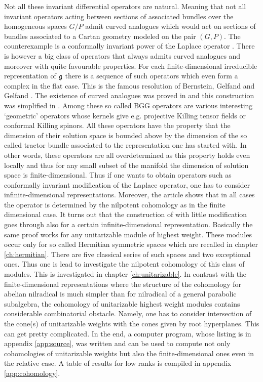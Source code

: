 Not all these invariant differential operators are natural. Meaning that not all invariant operators acting between sections of associated bundles over the homogeneous spaces $G/P$ admit curved analogues which would act on sections of bundles associated to a Cartan geometry modeled on the pair $(G, P)$. The counterexample is a conformally invariant power of the Laplace operator \cite{graham_conformally_1992, gover_conformally_2004}. There is however a big class of operators that always admits curved analogues and moreover with quite favourable properties. For each finite-dimensional irreducible representation of $\mathfrak{g}$ there is a sequence of such operators which even form a complex in the flat case. This is the famous resolution of Bernstein, Gelfand and Gelfand \cite{bernstein_differential_1975}. The existence of curved analogues was proved in \cite{cap_bernstein-gelfand-gelfand_2001} and this construction was simplified in \cite{calderbank_differential_2001}. Among these so called BGG operators are various interesting `geometric' operators whose kernels give e.g. projective Killing tensor fields or conformal Killing spinors. All these operators have the property that the dimension of their solution space is bounded above by the dimension of the so called tractor bundle associated to the representation one has started with. In other words, these operators are all overdetermined as this property holds even locally and thus for any small subset of the manifold the dimension of solution space is finite-dimensional. Thus if one wants to obtain operators such as conformally invariant modification of the Laplace operator, one has to consider infinite-dimensional representations. Moreover, the article \cite{shaynkman_unfolded_2006} shows that in all cases the operator is determined by the nilpotent cohomology as in the finite dimensional case. It turns out that the construction of \cite{calderbank_differential_2001} with little modification goes through also for a certain infinite-dimensional representation. Basically the same proof works for any unitarizable module of highest weight. These modules occur only for so called Hermitian symmetric spaces which are recalled in chapter \ref{ch:hermitian}. There are five classical series of such spaces and two exceptional ones. Thus one is lead to investigate the nilpotent cohomology of this class of modules. This is investigated in chapter \ref{ch:unitarizable}. In contrast with the finite-dimensional representations where the structure of the cohomology for abelian nilradical is much simpler than for nilradical of a general parabolic subalgebra, the cohomology of unitarizable highest weight modules contains considerable combinatorial obstacle. Namely, one has to consider intersection of the cone(s) of unitarizable weights with the cones given by root hyperplanes. This can get pretty complicated. In the end, a computer program, whose listing is in appendix \ref{app:source}, was written and can be used to compute not only cohomologies of unitarizable weights but also the finite-dimensional ones even in the relative case. A table of results for low ranks is compiled in appendix \ref{app:cohomology}.


